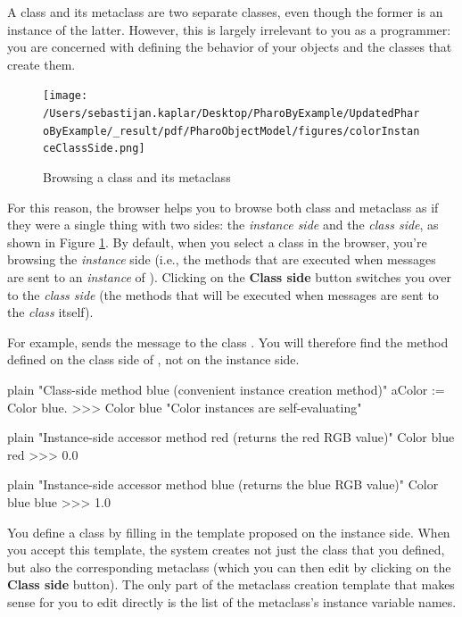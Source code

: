 \documentclass[10pt,twoside,english]{_support/latex/sbabook/sbabook}
\begin{document}
A class and its metaclass are two separate classes, even though the former is an
instance of the latter. However, this is largely irrelevant to you as a
programmer: you are concerned with defining the behavior of your objects and the
classes that create them.


\begin{figure}

\begin{center}
\texttt{[image: /Users/sebastijan.kaplar/Desktop/PharoByExample/UpdatedPharoByExample/\_result/pdf/PharoObjectModel/figures/colorInstanceClassSide.png]}\caption{Browsing a class and its metaclass\label{fig:colorInstanceClassSide}}\end{center}
\end{figure}


For this reason, the browser helps you to browse both class and metaclass as if
they were a single thing with two sides: the \textit{instance side} and the \textit{class
side}, as shown in Figure \ref{fig:colorInstanceClassSide}. By default, when you
select a class in the browser, you're browsing the \textit{instance} side (i.e., the
methods that are executed when messages are sent to an \textit{instance} of
). Clicking on the \textbf{Class side} button switches you over to the
\textit{class side} (the methods that will be executed when messages are sent to the
\textit{class}  itself).

For example,  sends the message  to the class .
You will therefore find the method  defined on the class side of
, not on the instance side.

\begin{displaycode}{plain}
"Class-side method blue (convenient instance creation method)"
aColor := Color blue.
>>> Color blue
"Color instances are self-evaluating"
\end{displaycode}

\begin{displaycode}{plain}
"Instance-side accessor method red (returns the red RGB value)"
Color blue red
>>> 0.0
\end{displaycode}

\begin{displaycode}{plain}
"Instance-side accessor method blue (returns the blue RGB value)"
Color blue blue
>>> 1.0
\end{displaycode}

You define a class by filling in the template proposed on the instance side.
When you accept this template, the system creates not just the class that you
defined, but also the corresponding metaclass (which you can then edit by
clicking on the \textbf{Class side} button). The only part of the metaclass creation
template that makes sense for you to edit directly is the list of the
metaclass's instance variable names.
\end{document}
